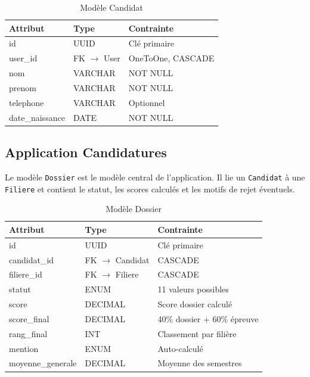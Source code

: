 \begin{table}[htbp]
  \centering
  \caption{Modèle Candidat}
  \begin{tabularx}{\textwidth}{@{} l l X @{}}
    \toprule
    \textbf{Attribut} & \textbf{Type} & \textbf{Contrainte} \\
    \midrule
    id & UUID & Clé primaire \\
    user\_id & FK $\rightarrow$ User & OneToOne, CASCADE \\
    nom & VARCHAR & NOT NULL \\
    prenom & VARCHAR & NOT NULL \\
    telephone & VARCHAR & Optionnel \\
    date\_naissance & DATE & NOT NULL \\
    \bottomrule
  \end{tabularx}
  \label{tab:model-candidat}
\end{table}

\subsection{Application Candidatures}
\label{application-candidatures}

Le modèle \texttt{Dossier} est le modèle central de l'application. Il lie un \texttt{Candidat} à une \texttt{Filiere} et contient le statut, les scores calculés et les motifs de rejet éventuels.

\begin{table}[htbp]
  \centering
  \caption{Modèle Dossier}
  \begin{tabularx}{\textwidth}{@{} l l X @{}}
    \toprule
    \textbf{Attribut} & \textbf{Type} & \textbf{Contrainte} \\
    \midrule
    id & UUID & Clé primaire \\
    candidat\_id & FK $\rightarrow$ Candidat & CASCADE \\
    filiere\_id & FK $\rightarrow$ Filiere & CASCADE \\
    statut & ENUM & 11 valeurs possibles \\
    score & DECIMAL & Score dossier calculé \\
    score\_final & DECIMAL & 40\% dossier + 60\% épreuve \\
    rang\_final & INT & Classement par filière \\
    mention & ENUM & Auto-calculé \\
    moyenne\_generale & DECIMAL & Moyenne des semestres \\
    \bottomrule
  \end{tabularx}
  \label{tab:model-dossier}
\end{table}

